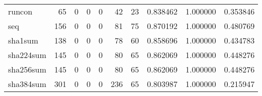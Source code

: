 \begin{longtable}{lrrrrrrrrr}
runcon    &                                    65 &                                                  0 &                                                  0 &                                                  0 &                                                 42 &                                                 23 &                                           0.838462 &                               1.000000 &                             0.353846 \\
seq       &                                   156 &                                                  0 &                                                  0 &                                                  0 &                                                 81 &                                                 75 &                                           0.870192 &                               1.000000 &                             0.480769 \\
sha1sum   &                                   138 &                                                  0 &                                                  0 &                                                  0 &                                                 78 &                                                 60 &                                           0.858696 &                               1.000000 &                             0.434783 \\
sha224sum &                                   145 &                                                  0 &                                                  0 &                                                  0 &                                                 80 &                                                 65 &                                           0.862069 &                               1.000000 &                             0.448276 \\
sha256sum &                                   145 &                                                  0 &                                                  0 &                                                  0 &                                                 80 &                                                 65 &                                           0.862069 &                               1.000000 &                             0.448276 \\
sha384sum &                                   301 &                                                  0 &                                                  0 &                                                  0 &                                                236 &                                                 65 &                                           0.803987 &                               1.000000 &                             0.215947 \\

\end{longtable}
